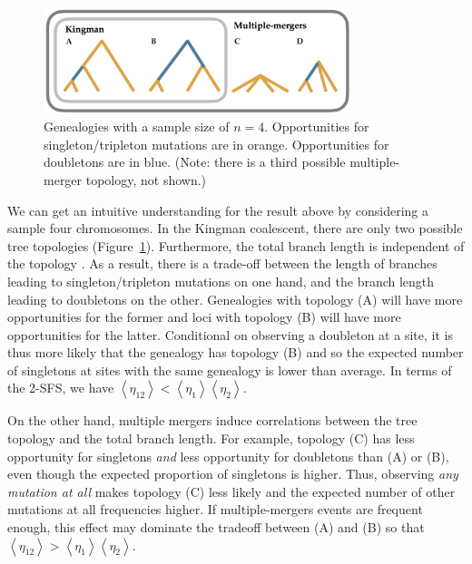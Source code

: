 \documentclass[11pt, letterpaper]{article}   	%
\newcommand{\Fig}[1]{Figure~\ref{#1}}
\newcommand{\E}[1]{\left< #1 \right>}
\begin{document}
\begin{figure}
\centering
\includegraphics[width=0.8\textwidth]{figures/trees.png}
\caption{Genealogies with a sample size of $n=4$. Opportunities for singleton/tripleton mutations are in orange. Opportunities for doubletons are in blue. (Note: there is a third possible multiple-merger topology, not shown.) \label{fig:trees}}
\end{figure}

We can get an intuitive understanding for the result above by considering a sample four chromosomes.
In the Kingman coalescent, there are only two possible tree topologies (\Fig{fig:trees}).
Furthermore, the total branch length is independent of the topology \cite{Wakeley2009}.
As a result, there is a trade-off between the length of branches leading to singleton/tripleton mutations on one hand, and the branch length leading to doubletons on the other.
Genealogies with topology (A) will have more opportunities for the former and loci with topology (B) will have more opportunities for the latter.
Conditional on observing a doubleton at a site, it is thus more likely that the genealogy has topology (B) and so the expected number of singletons at sites with the same genealogy is lower than average.
In terms of the 2-SFS, we have $\E{\eta_{12}} < \E{\eta_{1}} \E{\eta_{2}}$.

On the other hand, multiple mergers induce correlations between the tree topology and the total branch length.
For example, topology (C) has less opportunity for singletons \emph{and} less opportunity for doubletons than (A) or (B), even though the expected proportion of singletons is higher.
Thus, observing \emph{any mutation at all} makes topology (C) less likely and the expected number of other mutations at all frequencies higher.
If multiple-mergers events are frequent enough, this effect may dominate the tradeoff between (A) and (B) so that $\E{\eta_{12}} > \E{\eta_{1}} \E{\eta_{2}}$.
\end{document}
